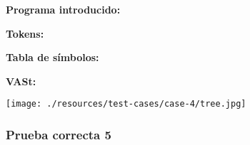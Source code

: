 \documentclass[11pt, , a4paper, titlepage]{article}
\newenvironment{changemargin}[2]{%
\begin{list}{}{%
\setlength{\topsep}{0pt}%
\setlength{\leftmargin}{#1}%
\setlength{\rightmargin}{#2}%
\setlength{\listparindent}{\parindent}%
\setlength{\itemindent}{\parindent}%
\setlength{\parsep}{\parskip}%
}%
\item[]}{\end{list}}
\begin{document}
\begin{changemargin}{+0.5cm}{+0cm}
    \vspace{1mm}                                                                 
    
    \textbf{Programa introducido:}
    \begin{changemargin}{+0.5cm}{+0cm}
        
    \end{changemargin}

    \vspace{2mm}                                                                 

    \textbf{Tokens:}
    \vspace{1mm}                                                                 
    \begin{changemargin}{+0.5cm}{+0cm}
    \end{changemargin}

    \vspace{2mm}                                                                 

    \textbf{Tabla de símbolos:}
    \vspace{1mm}                                                                 
    \begin{changemargin}{+0.5cm}{+0cm}
    \end{changemargin}

    \clearpage                                                                 

    \textbf{VASt:}
    \vspace{1mm} 
    \begin{center}
        \texttt{[image: ./resources/test-cases/case-4/tree.jpg]}
    \end{center}             

\end{changemargin}
\clearpage

\subsubsection{Prueba correcta 5}
\end{document}
